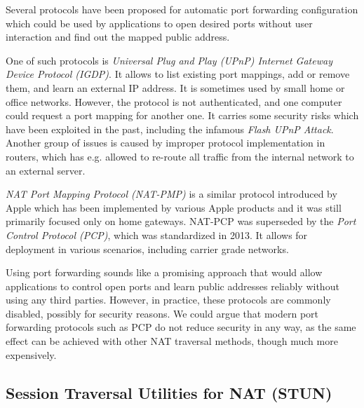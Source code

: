 Several protocols have been proposed for automatic port forwarding configuration which could be used by applications to open desired ports without user interaction and find out the mapped public address.

One of such protocols is \textit{Universal Plug and Play (UPnP) Internet Gateway Device Protocol (IGDP)}. It allows to list existing port mappings, add or remove them, and learn an external IP address. It is sometimes used by small home or office networks. However, the protocol is not authenticated, and one computer could request a port mapping for another one. It carries some security risks which have been exploited in the past, including the infamous \textit{Flash UPnP Attack}. Another group of issues is caused by improper protocol implementation in routers, which has e.g. allowed to re-route all traffic from the internal network to an external server. \cite{upnpbugs}

\textit{NAT Port Mapping Protocol (NAT-PMP)} is a similar protocol introduced by Apple which has been implemented by various Apple products and it was still primarily focused only on home gateways. NAT-PCP was superseded by the \textit{Port Control Protocol (PCP)}, which was standardized in 2013. \cite{pcp} It allows for deployment in various scenarios, including carrier grade networks.

Using port forwarding sounds like a promising approach that would allow applications to control open ports and learn public addresses reliably without using any third parties. However, in practice, these protocols are commonly disabled, possibly for security reasons. We could argue that modern port forwarding protocols such as PCP do not reduce security in any way, as the same effect can be achieved with other NAT traversal methods, though much more expensively.



\subsection{Session Traversal Utilities for NAT (STUN)}

